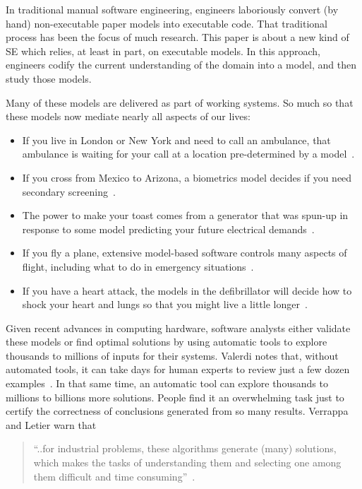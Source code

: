 \documentclass[10pt,journal,compsoc]{IEEEtran}
\newcommand{\bi}{\begin{itemize}}
\newcommand{\ei}{\end{itemize}}
\newcommand{\ADD}[1]{\textcolor{MyDarkBlue}{{\bf #1}}}
\begin{document}
In  traditional manual software engineering, engineers laboriously convert (by hand) non-executable paper models into executable code. 
That traditional process has been the focus of much research.  
This paper is about a new kind of SE which relies, at least in part, on executable models. 
In this approach, engineers codify the current understanding of the domain into a model, and then study those models.

Many of these models are delivered as part of working systems.
So much so that these models now
  mediate nearly all aspects of our lives:
\bi
\item If you
  live in London or New York and need to call an
  ambulance, that ambulance is waiting for your call
  at a location pre-determined by a model~\cite{veer11}. 
\item
If you cross from Mexico to Arizona,
a biometrics model  decides if you need
secondary screening~\cite{Sacanamboy09}.
\item
 The power to make your toast comes from a
  generator that was spun-up in response
  to some model predicting your future electrical
  demands~\cite{808235}.  
\item
If you fly a plane, extensive
  model-based software controls many aspects of
  flight, including what to do in emergency
  situations~\cite{Kim2011}. \item
If you have a heart attack, the
   models in the defibrillator will
  decide how to shock your heart and lungs so that
  you might live a little longer~\cite{kamp99}.
\ei

Given recent advances in computing hardware, software analysts either validate these models or find optimal solutions by using automatic tools to explore thousands to millions of inputs for their systems. 
Valerdi notes that, without automated tools, it can take days for human experts to review just a few dozen examples~\cite{valerdi11}.  
In that same time, an automatic tool can explore thousands to millions to billions more solutions.  
People find it an overwhelming task just to certify the correctness of conclusions generated from so many results. 
Verrappa and Letier warn that
\begin{quote}
``..for industrial problems, these algorithms generate
(many) solutions, which makes the tasks of
understanding them and selecting one among them
difficult and time consuming''~\cite{veer11}.
\end{quote}
\end{document}
